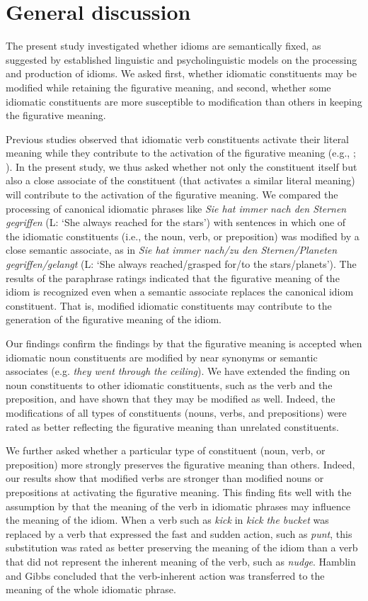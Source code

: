 \documentclass[output=paper]{langsci/langscibook}
\begin{document}
\section{General discussion}
The present study investigated whether idioms are semantically fixed, as suggested by established linguistic and psycholinguistic models on the processing and production of idioms. We asked first, whether idiomatic constituents may be modified while retaining the figurative meaning, and second, whether some idiomatic constituents are more susceptible to modification than others in keeping the figurative meaning. 

Previous studies observed that idiomatic verb constituents activate their literal meaning while they contribute to the activation of the figurative meaning (e.g., \citealt{rabanus:2008}; \citealt{smolka:2007}). In the present study, we thus asked whether not only the constituent itself but also a close associate of the constituent (that activates a similar literal meaning) will contribute to the activation of the figurative meaning. We compared the processing of canonical idiomatic phrases like \textit{Sie hat immer nach den Sternen gegriffen} (L: ‘She always reached for the stars’) with sentences in which one of the idiomatic constituents (i.e., the noun, verb, or preposition) was modified by a close semantic associate, as in \textit{Sie hat immer nach/zu den Sternen/Planeten gegriffen/gelangt} (L: ‘She always reached/grasped for/to the stars/planets’). The results of the paraphrase ratings indicated that the figurative meaning of the idiom is recognized even when a semantic associate replaces the canonical idiom constituent. That is, modified idiomatic constituents may contribute to the generation of the figurative meaning of the idiom. 

Our findings confirm the findings by \citet{geeraert:2017} that the figurative meaning is accepted when idiomatic noun constituents are modified by near synonyms or semantic associates (e.g. \textit{they went through the ceiling}).  We have extended the finding on noun constituents to other idiomatic constituents, such as the verb and the preposition, and have shown that they may be modified as well. Indeed, the modifications of all types of constituents (nouns, verbs, and prepositions) were rated as better reflecting the figurative meaning than unrelated constituents. 

We further asked whether a particular type of constituent (noun, verb, or preposition) more strongly preserves the figurative meaning than others.  Indeed, our results show that modified verbs are stronger than modified nouns or prepositions at activating the figurative meaning. This finding fits well with the assumption by \citet{hamblin:1999} that the meaning of the verb in idiomatic phrases may influence the meaning of the idiom. When a verb such as \textit{kick} in \textit{kick the bucket} was replaced by a verb that expressed the fast and sudden action, such as \textit{punt}, this substitution was rated as better preserving the meaning of the idiom than a verb that did not represent the inherent meaning of the verb, such as \textit{nudge}. Hamblin and Gibbs concluded that the verb-inherent action was transferred to the meaning of the whole idiomatic phrase.
\end{document}
